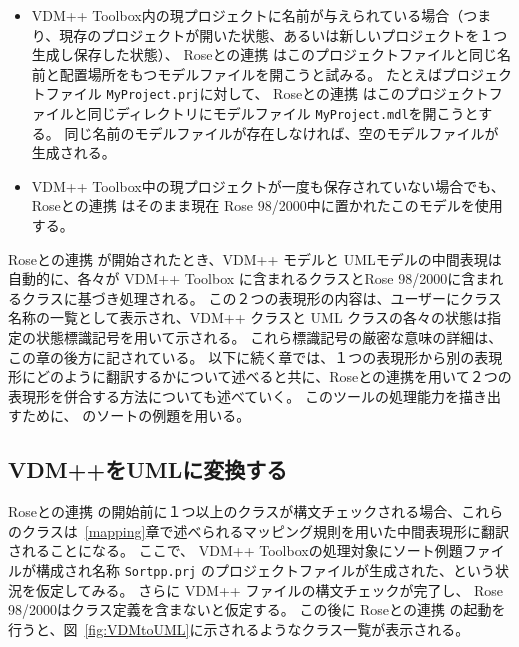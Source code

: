 \documentclass[\pformat,12pt]{jarticle}
\newcommand{\vdmpp}{VDM++}
\newcommand{\ToolboxName}{\vdmpp{} Toolbox}
\newcommand{\link}{Roseとの連携}
\newcommand{\rose}{Rose 98/2000}
\begin{document}
\begin{itemize}
\item \ToolboxName{}内の現プロジェクトに名前が与えられている場合（つまり、現存のプロジェクトが開いた状態、あるいは新しいプロジェクトを１つ生成し保存した状態）、 \link{} はこのプロジェクトファイルと同じ名前と配置場所をもつモデルファイルを開こうと試みる。
たとえばプロジェクトファイル {\tt MyProject.prj}に対して、 \link{} はこのプロジェクトファイルと同じディレクトリにモデルファイル  {\tt MyProject.mdl}を開こうとする。
 同じ名前のモデルファイルが存在しなければ、空のモデルファイルが生成される。
\item \ToolboxName{}中の現プロジェクトが一度も保存されていない場合でも、 \link{} はそのまま現在 \rose{}中に置かれたこのモデルを使用する。
\end{itemize}
 \link{} が開始されたとき、\vdmpp{} モデルと UMLモデルの中間表現は自動的に、各々が \vdmpp{} Toolbox に含まれるクラスと\rose{}に含まれるクラスに基づき処理される。
この２つの表現形の内容は、ユーザーにクラス名称の一覧として表示され、\vdmpp{} クラスと UML クラスの各々の状態は指定の状態標識記号を用いて示される。
これら標識記号の厳密な意味の詳細は、この章の後方に記されている。
以下に続く章では、１つの表現形から別の表現形にどのように翻訳するかについて述べると共に、\link{}を用いて２つの表現形を併合する方法についても述べていく。
このツールの処理能力を描き出すために、 \cite{UserManPP-SCSK}のソートの例題を用いる。

\subsection{VDM++をUMLに変換する} \label{trans1}

 \link{} の開始前に１つ以上のクラスが構文チェックされる場合、これらのクラスは~\ref{mapping}章で述べられるマッピング規則を用いた中間表現形に翻訳されることになる。
ここで、 \vdmpp{} Toolboxの処理対象にソート例題ファイルが構成され名称 {\tt Sortpp.prj} のプロジェクトファイルが生成された、という状況を仮定してみる。
さらに \vdmpp{} ファイルの構文チェックが完了し、 \rose{}はクラス定義を含まないと仮定する。
この後に \link{} の起動を行うと、図~\ref{fig:VDMtoUML}に示されるようなクラス一覧が表示される。
\end{document}
